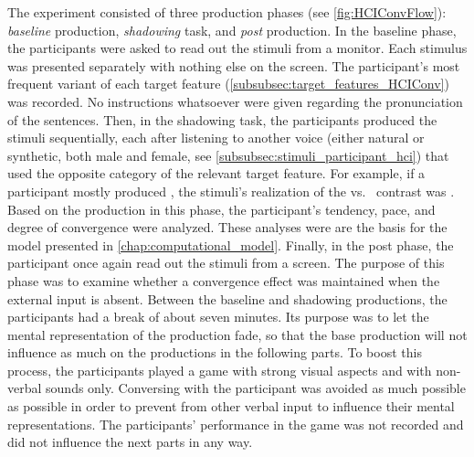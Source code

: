 The experiment consisted of three production phases (see \cref{fig:HCIConvFlow}): \emph{baseline} production, \emph{shadowing} task, and \emph{post} production.
In the baseline phase, the participants were asked to read out the stimuli from a monitor.
Each stimulus was presented separately with nothing else on the screen.
The participant's most frequent variant of each target feature (\cref{subsubsec:target_features_HCIConv}) was recorded.
No instructions whatsoever were given regarding the pronunciation of the sentences.
Then, in the shadowing task, the participants produced the stimuli sequentially, each after listening to another voice (either natural or synthetic, both male and female, see \cref{subsubsec:stimuli_participant_hci}) that used the opposite category of the relevant target feature.
For example, if a participant mostly produced \textipa{[\c{c}]}, the stimuli's realization of the \textipa{[\c{c}]} vs.\ \textipa{[k]} contrast was \textipa{[k]}.
Based on the production in this phase, the participant's tendency, pace, and degree of convergence were analyzed.
These analyses were are the basis for the model presented in \cref{chap:computational_model}.
Finally, in the post phase, the participant once again read out the stimuli from a screen.
The purpose of this phase was to examine whether a convergence effect was maintained when the external input is absent.
Between the baseline and shadowing productions, the participants had a break of about seven minutes.
Its purpose was to let the mental representation of the production fade, so that the base production will not influence as much on the productions in the following parts.
To boost this process, the participants played a game with strong visual aspects and with non-verbal sounds only.
Conversing with the participant was avoided as much possible as possible in order to prevent from other verbal input to influence their mental representations.
The participants' performance in the game was not recorded and did not influence the next parts in any way.

